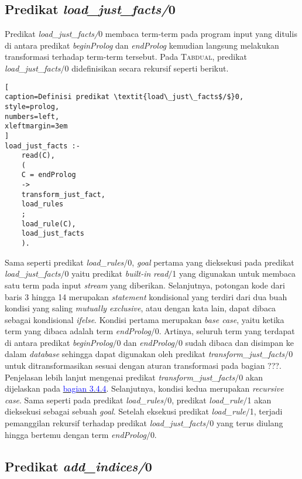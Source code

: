 \subsection{Predikat \textit{load\_just\_facts/}0}

Predikat \textit{load\_just\_facts/}0 membaca term-term pada program input yang ditulis di antara predikat \textit{beginProlog} dan \textit{endProlog} kemudian langsung melakukan transformasi terhadap term-term tersebut. Pada \textsc{Tabdual}, predikat \textit{load\_just\_facts$/$}0 didefinisikan secara rekursif seperti berikut.
\\

\begin{lstlisting}[
caption=Definisi predikat \textit{load\_just\_facts$/$}0,
style=prolog,
numbers=left,
xleftmargin=3em
]
load_just_facts :-
	read(C),
	(
	C = endProlog
	->
	transform_just_fact,
	load_rules
	;
	load_rule(C),
	load_just_facts
	).
\end{lstlisting}

Sama seperti predikat \textit{load\_rules$/$}0, \textit{goal} pertama yang dieksekusi pada predikat \textit{load\_just\_facts$/$}0  yaitu predikat \textit{built-in} \textit{read$/$}1 yang digunakan untuk membaca satu term pada input \textit{stream} yang diberikan. Selanjutnya, potongan kode dari baris 3 hingga 14 merupakan \textit{statement} kondisional yang terdiri dari dua buah kondisi yang saling \textit{mutually exclusive}, atau dengan kata lain, dapat dibaca sebagai kondisional \textit{if\textendash else}. Kondisi pertama merupakan \textit{base case}, yaitu ketika term yang dibaca adalah term \textit{endProlog$/$}0. Artinya, seluruh term yang terdapat di antara predikat \textit{beginProlog$/$}0 dan \textit{endProlog$/$}0 sudah dibaca dan disimpan ke dalam \textit{database} sehingga dapat digunakan oleh predikat \textit{transform\_just\_facts$/$}0 \label{justfacts2} untuk ditransformasikan sesuai dengan aturan transformasi pada bagian ???. Penjelasan lebih lanjut mengenai predikat \textit{transform\_just\_facts$/$}0 akan dijelaskan pada \hyperref[justfacts]{\textcolor{blue}{bagian 3.4.4}}. Selanjutnya, kondisi kedua merupakan \textit{recursive case}. Sama seperti pada predikat \textit{load\_rules$/$}0, predikat \textit{load\_rule$/$}1 akan dieksekusi sebagai sebuah \textit{goal}. Setelah eksekusi predikat \textit{load\_rule$/$}1, terjadi pemanggilan rekursif terhadap predikat \textit{load\_just\_facts$/$}0 yang terus diulang hingga bertemu dengan term \textit{endProlog$/$}0.

\subsection{Predikat \textit{add\_indices/}0}
\label{subsec:add_indices}

